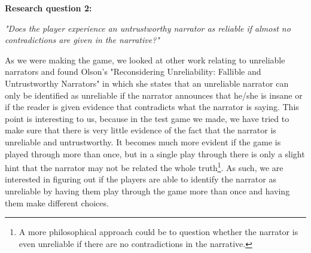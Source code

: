 \textbf{Research question 2:}
\begin{center}
\textit{"Does the player experience an untrustworthy narrator as reliable if almost no contradictions are given in the narrative?"}
\end{center}
As we were making the game, we looked at other work relating to unreliable narrators and found Olson's "Reconsidering Unreliability: Fallible and Untrustworthy Narrators" in which she states that an unreliable narrator can only be identified as unreliable if the narrator announces that he/she is insane or if the reader is given evidence that contradicts what the narrator is saying\cite[p. 104]{Olson}. This point is interesting to us, because in the test game we made, we have tried to make sure that there is very little evidence of the fact that the narrator is unreliable and untrustworthy. It becomes much more evident if the game is played through more than once, but in a single play through there is only a slight hint that the narrator may not be related the whole truth\footnote{A more philosophical approach could be to question whether the narrator is even unreliable if there are no contradictions in the narrative.}. As such, we are interested in figuring out if the players are able to identify the narrator as unreliable by having them play through the game more than once and having them make different choices.